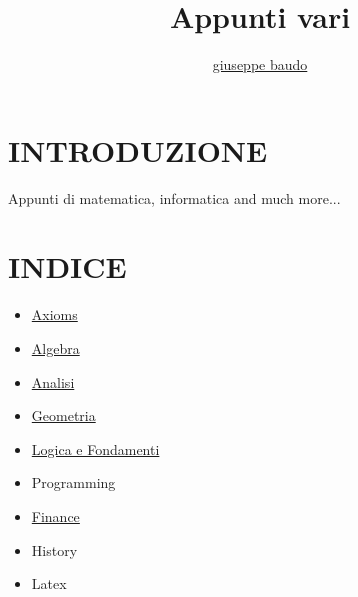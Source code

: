 \documentclass[a4paper,10pt]{article}
\title{Appunti vari}
\author{\href{http://www.baudo.hol.es}{giuseppe baudo}}
\begin{document}
\maketitle

\section{INTRODUZIONE}
Appunti di matematica, informatica and much more...

\section{INDICE}
\begin{itemize}
  \item \href{./axioms/Axioms.html}{Axioms}
  \item \href{./algebra/AlgebraIndex.html}{Algebra}
  \item \href{./analisi/Analisi.html}{Analisi} 
  \item \href{./geometria/Geometria.html}{Geometria} 
  \item \href{./logica/Logics.html}{Logica e Fondamenti}
  \item Programming
  \item \href{./finance/finance.html}{Finance} 
  \item History 
  \item Latex 
  
\end{itemize}
\end{document}
